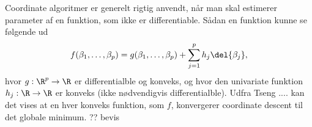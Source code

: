 Coordinate algoritmer er generelt rigtig anvendt, når man skal estimerer parameter af en funktion, som ikke er differentiable. Sådan en funktion kunne se følgende ud
\begin{align*}
f(\beta_1, \dots, \beta_p) = g(\beta_1, \dots, \beta_p) + \sum_{j = 1}^p h_j \del{\beta_j},
\end{align*}
hvor $g: \R^p \rightarrow \R $ er differentialble og konveks, og hvor den univariate funktion $h_j : \R \rightarrow \R$ er konveks (ikke nødvendigvis differentialble). Udfra Tseng .... kan det vises at en hver konveks funktion, som $f$, konvergerer coordinate descent til det globale minimum. 
?? bevis

